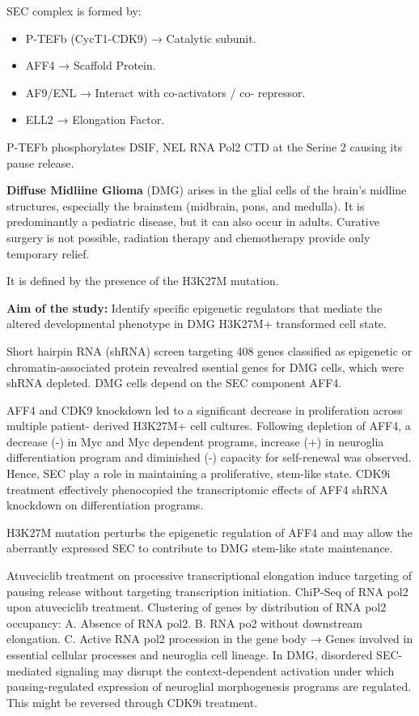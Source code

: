 SEC complex is formed by:
\begin{itemize}
\item P-TEFb (CycT1-CDK9) → Catalytic subunit.
\item AFF4 → Scaffold Protein.
\item AF9/ENL → Interact with co-activators / co-
repressor.
\item ELL2 → Elongation Factor.
\end{itemize}

P-TEFb phosphorylates DSIF, NEL RNA Pol2 CTD at the Serine 2 causing its pause release.

\textbf{Diffuse Midliine Glioma} (DMG) arises in the glial cells of the brain’s midline
structures, especially the brainstem (midbrain,
pons, and medulla).  It is predominantly a pediatric disease, but it can
also occur in adults.
Curative surgery is not possible, radiation therapy
and chemotherapy provide only temporary relief.

It is defined by the presence of the H3K27M mutation.


\textbf{Aim of the study:} Identify specific epigenetic regulators that mediate the
altered developmental phenotype in DMG H3K27M+
transformed cell state.

Short hairpin RNA (shRNA) screen targeting 408 genes classified as epigenetic or chromatin-associated
protein revealred ssential genes for DMG cells, which were shRNA depleted.  DMG cells depend on the SEC component AFF4.

AFF4 and CDK9 knockdown led to a significant
decrease in proliferation across multiple patient-
derived H3K27M+ cell cultures.
Following depletion of AFF4, a decrease (-) in Myc and Myc dependent programs, increase (+) in neuroglia differentiation program
and diminished (-) capacity for self-renewal was observed. Hence, SEC play a role in maintaining a proliferative, stem-like state. CDK9i treatment effectively phenocopied the transcriptomic effects of AFF4 shRNA knockdown on differentiation programs.

H3K27M mutation perturbs the epigenetic regulation of AFF4 and may allow the aberrantly expressed SEC to contribute to DMG stem-like state maintenance.

Atuveciclib treatment on processive transcriptional
elongation induce targeting of pausing release
without targeting transcription initiation. ChiP-Seq of RNA pol2 upon atuveciclib treatment.
Clustering of genes by distribution of RNA pol2
occupancy:
A. Absence of RNA pol2.
B. RNA po2 without downstream elongation.
C. Active RNA pol2 procession in the gene body
→ Genes involved in essential cellular
processes and neuroglia cell lineage.
In DMG, disordered SEC-mediated signaling may disrupt the context-dependent activation under which
pausing-regulated expression of neuroglial morphogenesis programs are regulated. This might be
reversed through CDK9i treatment.

